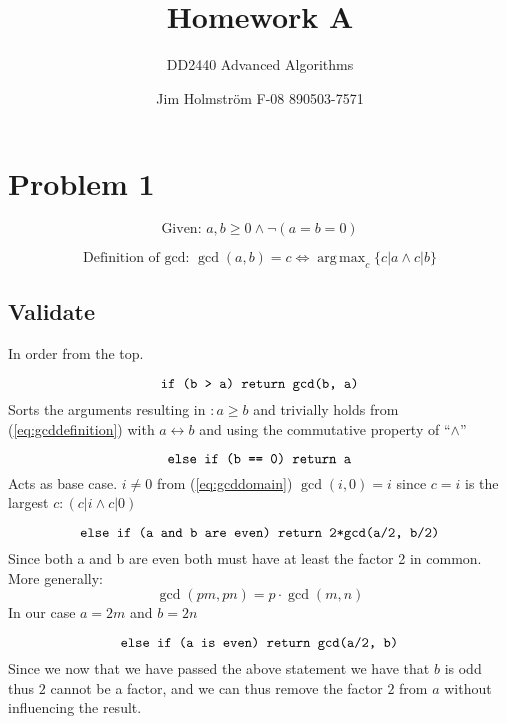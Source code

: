 \documentclass[a4paper,twoside=false,abstract=false,numbers=noenddot,
titlepage=false,headings=small,parskip=half,version=last]{scrartcl}
\author{Jim Holmström F-08 890503-7571}
\title{Homework A}
\subtitle{DD2440 Advanced Algorithms}
\DeclareMathOperator*{\argmax}{arg\,max}
\begin{document}
\maketitle

\section{Problem 1}

\begin{equation} \label{eq:gcddomain}
    \text{Given: }    a,b \ge 0 \wedge \neg(a=b=0)
\end{equation}

\begin{equation} \label{eq:gcddefinition}
   \text{Definition of gcd: } \gcd(a,b)=c \iff \argmax_c \{c|a \wedge c|b\}
\end{equation}

\subsection{Validate}

In order from the top. %

\begin{equation} \label{eq:statement1}
    \verb+if (b > a) return gcd(b, a)+
\end{equation}
Sorts the arguments resulting in $: a \ge b$ and trivially holds from (\ref{eq:gcddefinition}) with $a \leftrightarrow b$ and using the commutative property of ``$\wedge$''

\begin{equation} \label{eq:statement2}
    \verb+else if (b == 0) return a+
\end{equation}
Acts as base case. $i \neq 0$ from (\ref{eq:gcddomain}) $\gcd(i,0)=i$ since $c=i$ is the largest $c : (c|i \wedge c|0)$

\begin{equation} \label{eq:statement3}
    \verb+else if (a and b are even) return 2*gcd(a/2, b/2)+ 
\end{equation}
Since both a and b are even both must have at least the factor 2 in common.
More generally:
\begin{equation}
    \gcd(pm,pn)=p\cdot \gcd(m,n)
\end{equation}
In our case $a=2m$ and $b=2n$

\begin{equation} \label{eq:statement4}
    \verb+else if (a is even) return gcd(a/2, b)+
\end{equation}
Since we now that we have passed the above statement we have that $b$ is odd thus $2$ cannot be a factor, and we can thus remove the factor $2$ from $a$ without influencing the result.
\end{document}
